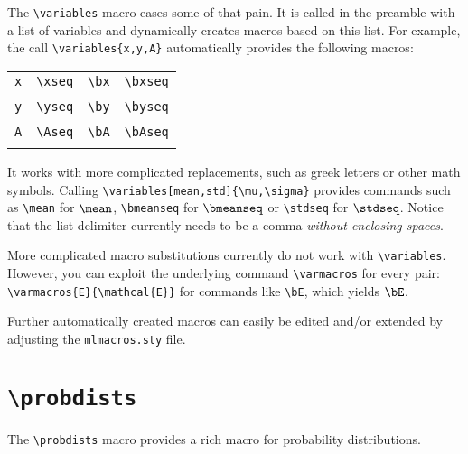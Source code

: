 \documentclass
[
]
{article}
\begin{document}
The \texttt{\textbackslash variables} macro eases some of that pain. It is called in the preamble with a list of variables and dynamically creates macros based on this list. For example, the call \texttt{\textbackslash variables\{x,y,A\}} automatically provides the following macros:
\setlength{}
\begin{table}[h!]
	\centering
	\begin{tabular}{cccc}
		\texttt{x} & \texttt{\textbackslash xseq}& \texttt{\textbackslash bx}&  \texttt{\textbackslash bxseq}\\
				   & \xseq						 & \bx                       & \bxseq\\
		\texttt{y} & \texttt{\textbackslash yseq}& \texttt{\textbackslash by}&  \texttt{\textbackslash byseq}\\
		& \yseq						 & \by                       & \byseq\\
		\texttt{A} & \texttt{\textbackslash Aseq}& \texttt{\textbackslash bA}&  \texttt{\textbackslash bAseq}\\
		& \Aseq						 & \bA                       & \bAseq
	\end{tabular}
\end{table}
\setlength{}
\newline It works with more complicated replacements, such as greek letters or other math symbols. 
Calling \texttt{\textbackslash variables[mean,std]\{\textbackslash mu,\textbackslash sigma\}} provides commands such as \texttt{\textbackslash mean} for $\mean$, \texttt{\textbackslash bmeanseq} for $\bmeanseq$ or \texttt{\textbackslash stdseq} for $\stdseq$.
Notice that the list delimiter currently needs to be a comma \emph{without enclosing spaces}.

More complicated macro substitutions currently do not work with \texttt{\textbackslash variables}. However, you can exploit the underlying command \texttt{\textbackslash varmacros} for every pair: \texttt{\textbackslash varmacros\{E\}\{\textbackslash mathcal\{E\}\}} for commands like \texttt{\textbackslash bE}, which yields $\bE$.

Further automatically created macros can easily be edited and/or extended by adjusting the \texttt{mlmacros.sty} file.


\section{\texttt{\textbackslash probdists}}\label{sec:probdists}
The \texttt{\textbackslash probdists} macro provides a rich macro for probability distributions.
\end{document}
